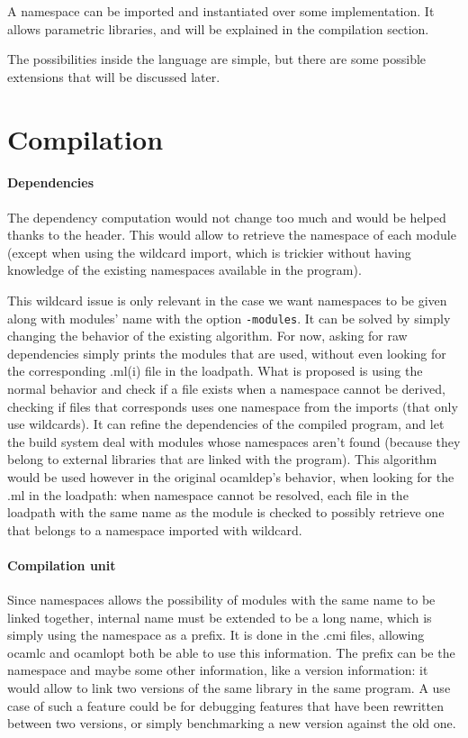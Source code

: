 \documentclass[11pt,a4paper]{article}
\begin{document}
A namespace can be imported and instantiated over some implementation. It allows
parametric libraries, and will be explained in the compilation section. 

The possibilities inside the language are simple, but there are some possible
extensions that will be discussed later.

\section{Compilation}

\paragraph{Dependencies}

The dependency computation would not change too much and would be helped thanks
to the header. This would allow to retrieve the namespace of each module (except
when using the wildcard import, which is trickier without having knowledge of
the existing namespaces available in the program).

This wildcard issue is only relevant in the case we want namespaces to be given
along with modules' name with the option \texttt{-modules}. It can be solved by
simply changing the behavior of the existing algorithm. For now, asking for raw
dependencies simply prints the modules that are used, without even looking for
the corresponding .ml(i) file in the loadpath. What is proposed is using the
normal behavior and check if a file exists when a namespace cannot be derived,
checking if files that corresponds uses one namespace from the imports (that
only use wildcards). It can refine the dependencies of the compiled program, and
let the build system deal with modules whose namespaces aren't found (because
they belong to external libraries that are linked with the program). This
algorithm would be used however in the original ocamldep's behavior, when
looking for the .ml in the loadpath: when namespace cannot be resolved, each file
in the loadpath with the same name as the module is checked to possibly retrieve
one that belongs to a namespace imported with wildcard.


\paragraph{Compilation unit}

Since namespaces allows the possibility of modules with the same name to be
linked together, internal name must be extended to be a long name, which is simply
using the namespace as a prefix. It is done in the .cmi files, allowing ocamlc
and ocamlopt both be able to use this information. The prefix can be the
namespace and maybe some other information, like a version information: it would
allow to link two versions of the same library in the same program. A use case
of such a feature could be for debugging features that have been rewritten
between two versions, or simply benchmarking a new version against the old one.
\end{document}

